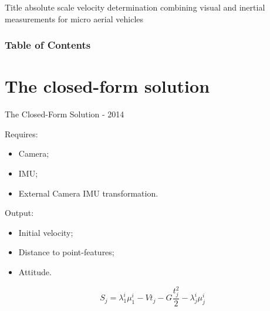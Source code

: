 \documentclass{beamer}
\begin{document}
\begin{frame}{Title}
absolute scale velocity determination combining visual and inertial measurements for micro aerial vehicles
\end{frame}


\begin{frame}
\frametitle{Table of Contents}
\tableofcontents
\end{frame}

\section{The closed-form solution}

\begin{frame}{The Closed-Form Solution - 2014}

Requires:
\begin{itemize}
\item Camera;
\item IMU;
\item External Camera IMU transformation.
\end{itemize}

Output:
\begin{itemize}
\item \alert<2->{Initial velocity};
\item \alert<2->{Distance to point-features};
\item Attitude.
\end{itemize}


\[
S_j = \lambda_1^i\mu_1^i - V t_j - G \frac{t_j^2}{2} - \lambda^i_j \mu^i_j
\]
\end{frame}
\end{document}
